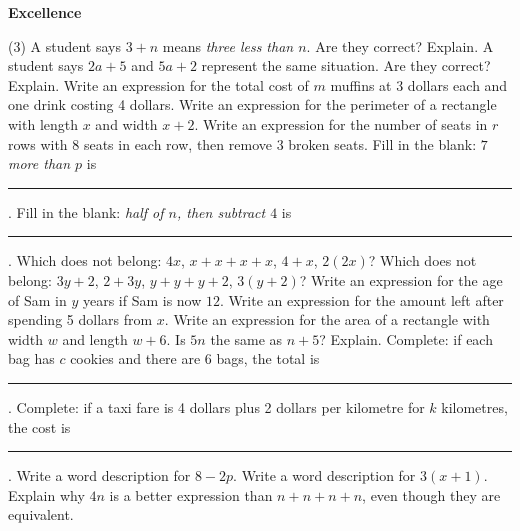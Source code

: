 \documentclass[17pt,a4paper,landscape]{extarticle}
\begin{document}
\sffamily
\boldmath

\boldmath

{\LARGE \textbf{Excellence}}
\begin{tasks}(3)
\task A student says \mbox{$3+n$} means \textit{three less than \mbox{$n$}}. Are they correct? Explain.
\task A student says \mbox{$2a+5$} and \mbox{$5a+2$} represent the same situation. Are they correct? Explain.
\task Write an expression for the total cost of \mbox{$m$} muffins at 3 dollars each and one drink costing 4 dollars.
\task Write an expression for the perimeter of a rectangle with length \mbox{$x$} and width \mbox{$x+2$}.
\task Write an expression for the number of seats in \mbox{$r$} rows with \mbox{$8$} seats in each row, then remove \mbox{$3$} broken seats.
\task Fill in the blank: \textit{\mbox{$7$} more than \mbox{$p$}} is \rule{2cm}{0.15mm}.
\task Fill in the blank: \textit{half of \mbox{$n$}, then subtract \mbox{$4$}} is \rule{2.6cm}{0.15mm}.
\task Which does not belong: \mbox{$4x$}, \mbox{$x+x+x+x$}, \mbox{$4+x$}, \mbox{$2(2x)$}?
\task Which does not belong: \mbox{$3y+2$}, \mbox{$2+3y$}, \mbox{$y+y+y+2$}, \mbox{$3(y+2)$}?
\task Write an expression for the age of Sam in \mbox{$y$} years if Sam is now \mbox{$12$}.
\task Write an expression for the amount left after spending 5 dollars from \mbox{$x$}.
\task Write an expression for the area of a rectangle with width \mbox{$w$} and length \mbox{$w+6$}.
\task Is \mbox{$5n$} the same as \mbox{$n+5$}? Explain.
\task Complete: if each bag has \mbox{$c$} cookies and there are \mbox{$6$} bags, the total is \rule{2cm}{0.15mm}.
\task Complete: if a taxi fare is 4 dollars plus 2 dollars per kilometre for \mbox{$k$} kilometres, the cost is \rule{2.4cm}{0.15mm}.
\task Write a word description for \mbox{$8-2p$}.
\task Write a word description for \mbox{$3(x+1)$}.
\task Explain why \mbox{$4n$} is a better expression than \mbox{$n+n+n+n$}, even though they are equivalent.
\end{tasks}
\end{document}
